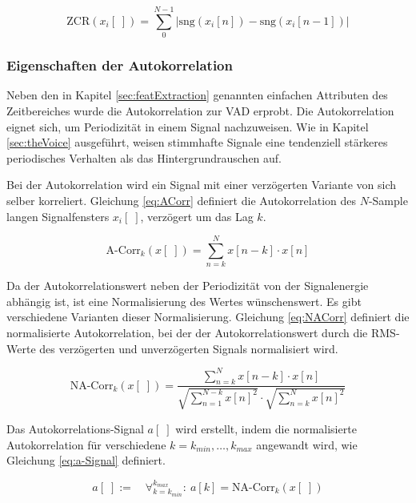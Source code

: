 \begin{equation}
\text{ZCR}(x_i[\;]) = \sum_{0}^{N-1}|\text{sng}(x_i[n])-\text{sng}(x_i[n-1])|
\label{eq:zcr}
\end{equation}

\subsubsection{Eigenschaften der Autokorrelation}

Neben den in Kapitel \ref{sec:featExtraction} genannten \glqq einfachen\grqq{} Attributen des Zeitbereiches wurde die Autokorrelation zur VAD erprobt. Die Autokorrelation eignet sich, um Periodizität in einem Signal nachzuweisen. Wie in Kapitel \ref{sec:theVoice} ausgeführt, weisen stimmhafte Signale eine tendenziell stärkeres periodisches Verhalten als das Hintergrundrauschen auf. 

Bei der Autokorrelation wird ein Signal mit einer verzögerten Variante von sich selber korreliert. Gleichung \ref{eq:ACorr} definiert die Autokorrelation des $N$-Sample langen Signalfensters $x_i[\;]$, verzögert um das Lag $k$.

\begin{equation}
\text{A-Corr}_k(x[\;]) = \sum_{n=k}^{N} x[n-k] \cdot x[n]
\label{eq:ACorr}
\end{equation}

Da der Autokorrelationswert neben der Periodizität von der Signalenergie abhängig ist, ist eine Normalisierung des Wertes wünschenswert. Es gibt verschiedene Varianten dieser Normalisierung. Gleichung \ref{eq:NACorr} definiert die \glqq normalisierte Autokorrelation\grqq{}, bei der der Autokorrelationswert durch die RMS-Werte des verzögerten und unverzögerten Signals normalisiert wird.\cite{vad_Lisboa}

\begin{equation}
\text{NA-Corr}_k(x[\;]) = \frac{\sum_{n=k}^{N} x[n-k] \cdot x[n]}{ \sqrt{\sum_{n=1}^{N-k}  x[n]^2}  \cdot  \sqrt{\sum_{n=k}^{N}  x[n]^2} }
\label{eq:NACorr}
\end{equation}

Das Autokorrelations-Signal $a[\;]$ wird erstellt, indem die normalisierte Autokorrelation für verschiedene $k = k_{min} , \ldots , k_{max}$ angewandt wird, wie Gleichung \ref{eq:a-Signal} definiert. 

\begin{equation}
a[\;] := \quad \mathop{\forall}_{k = k_{min}}^{k_{max}} :\ a[k] = \text{NA-Corr}_k(x[\;]) 
\label{eq:a-Signal}
\end{equation}


